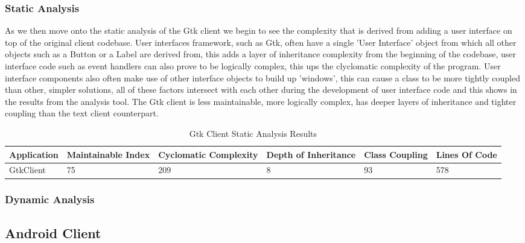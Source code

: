 \documentclass{article}
\begin{document}
\subsubsection{Static Analysis}
As we then move onto the static analysis of the Gtk client we begin to see the complexity that is derived from adding a user interface on top of the original client codebase. User interfaces framework, such as Gtk, often have a single 'User Interface' object from which all other objects such as a Button or a Label are derived from, this adds a layer of inheritance complexity from the beginning of the codebase, user interface code such as event handlers can also prove to be logically complex, this ups the clyclomatic complexity of the program. User interface components also often make use of other interface objects to build up 'windows', this can cause a class to be more tightly coupled than other, simpler solutions, all of these factors intersect with each other during the development of user interface code and this shows in the results from the analysis tool. The Gtk client is less maintainable, more logically complex, has deeper layers of inheritance and tighter coupling than the text client counterpart.
\begin{table}[H]
	\centering
	\caption{Gtk Client Static Analysis Results}
	\label{my-label}
	\begin{tabularx}{\textwidth}{|X|X|X|X|X|X|}
		\hline
		\textbf{Application} & \textbf{Maintainable Index} & \textbf{Cyclomatic Complexity} & \textbf{Depth of Inheritance} & \textbf{Class Coupling} & \textbf{Lines Of Code} \\ \hline
		GtkClient & 75 &     209      &      8     &     93      &      578     \\ \hline
	\end{tabularx}
\end{table}
\subsubsection{Dynamic Analysis}

\subsection{Android Client}
\end{document}
